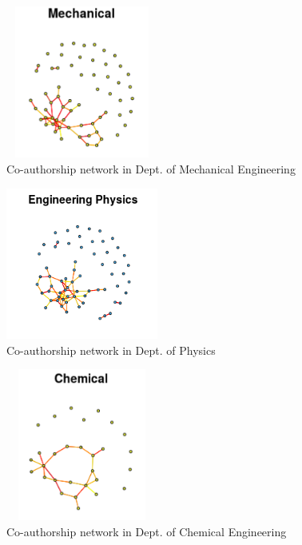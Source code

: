 \documentclass[conference,compsoc]{IEEEtran}
\begin{document}
\begin{figure}[h]
    \centering
    \includegraphics[width=5cm,height=5cm]{me}
    \caption{Co-authorship network in Dept. of Mechanical Engineering}
    \label{fig:me}
\end{figure}

\begin{figure}[h]
    \centering
    \includegraphics[width=5cm,height=5cm]{ep}
    \caption{Co-authorship network in Dept. of Physics}
    \label{fig:ep}
\end{figure}

\begin{figure}[t]
    \centering
    \includegraphics[width=5cm,height=5cm]{ch}
    \caption{Co-authorship network in Dept. of Chemical Engineering}
    \label{fig:ch}
\end{figure}


\end{document}
